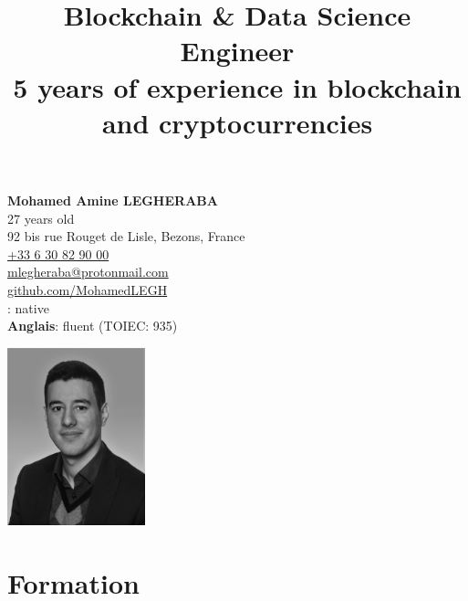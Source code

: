 \documentclass[10pt]{article}
\title{\bfseries{\huge{Blockchain \& Data Science Engineer}}\\[0.75cm] \Large{5 years of experience in blockchain and cryptocurrencies} }
\author{\bfseries\Huge \vspace{-4ex}}
\date{}
\begin{document}
\begin{minipage}[t]{0.80\textwidth}
\textbf{\Large{Mohamed Amine LEGHERABA}}\\
\vspace{4ex}27 years old\\
92 bis rue Rouget de Lisle, Bezons, France\\
\href{tel:+33630829000}{+33 6 30 82 90 00}\\
\href{mailto:mlegheraba@protonmail.com}{mlegheraba@protonmail.com}\\
\href{https://github.com/MohamedLEGH}{github.com/MohamedLEGH}\\
\vspace{5ex}{\bf French}: native\\
{\bf Anglais}: fluent (TOIEC: 935)\\
\end{minipage}
\begin{minipage}[t]{0.20\textwidth}
\vspace{-3ex}
\includegraphics[width=4cm]{figures/Legheraba-Mohamed-White.jpg}
\end{minipage}
{\let\newpage\relax\maketitle}
\thispagestyle{empty}

\vspace{-10ex}

\section*{Formation}

\vspace{2ex}
\end{document}

